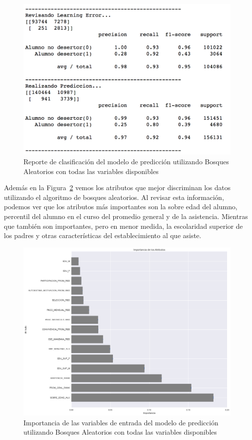 \begin{figure}[H]
  \centering
    \includegraphics[trim=0cm 0cm 0cm 0cm,scale=0.65]{Figuras/7AnalisisResultado/clas-total.png}
      \caption{Reporte de clasificación del modelo de predicción utilizando Bosques Aleatorios con todas las variables disponibles}
    \label{fig:clas-total}
\end{figure}
Además en la Figura~\ref{fig:impo-total} vemos los atributos que mejor discriminan los datos utilizando el algoritmo de bosques aleatorios. Al revisar esta información, podemos ver que los atributos más importantes son la sobre edad del alumno, percentil del alumno en el curso del promedio general y de la asistencia. Mientras que también son importantes, pero en menor medida, la escolaridad superior de los padres y otras características del establecimiento al que asiste.
\begin{figure}[H]
  \centering
    \includegraphics[trim=0cm 0cm 0cm 0cm,scale=0.4]{Figuras/7AnalisisResultado/impo-total.png}
      \caption{Importancia de las variables de entrada del modelo de predicción utilizando Bosques Aleatorios con todas las variables disponibles}
    \label{fig:impo-total}
\end{figure}
